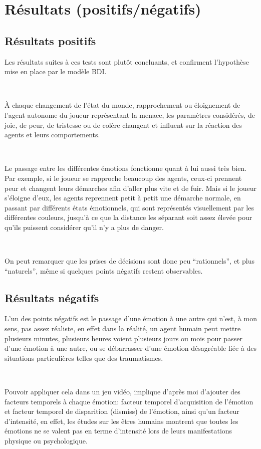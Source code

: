 \section{Résultats (positifs/négatifs)}

\subsection{Résultats positifs}

Les résultats suites à ces tests sont plutôt concluants, et confirment l’hypothèse mise en place par le modèle BDI.


~\par
À chaque changement de l’état du monde, rapprochement ou éloignement de l’agent autonome du joueur représentant la menace, les paramètres considérés, de joie, de peur, de tristesse ou de colère changent et influent sur la réaction des agents et leurs comportements.


~\par
Le passage entre les différentes émotions fonctionne quant à lui aussi très bien. Par exemple, si le joueur se rapproche beaucoup des agents, ceux-ci prennent peur et changent leurs démarches afin d’aller plus vite et de fuir. Mais si le joueur s’éloigne d’eux, les agents reprennent petit à petit une démarche normale, en passant par différents états émotionnels, qui sont représentés visuellement par les différentes couleurs, jusqu’à ce que la distance les séparant soit assez élevée pour qu’ils puissent considérer qu’il n’y a plus de danger.


~\par
On peut remarquer que les prises de décisions sont donc peu “rationnels”, et plus “naturels”, même si quelques points négatifs restent observables.

\subsection{Résultats négatifs}

L’un des points négatifs est le passage d’une émotion à une autre qui n’est, à mon sens, pas assez réaliste, en effet dans la réalité, un agent humain peut mettre plusieurs minutes, plusieurs heures voient plusieurs jours ou mois pour passer d’une émotion à une autre, ou se débarrasser d’une émotion désagréable liée à des situations particulières telles que des traumatismes.

~\par
Pouvoir appliquer cela dans un jeu vidéo, implique d'après moi d’ajouter des facteurs temporels à chaque émotion: facteur temporel d'acquisition de l’émotion et facteur temporel de disparition (dismiss) de l’émotion, ainsi qu'un facteur d’intensité, en effet, les études sur les êtres humains montrent que toutes les émotions ne se valent pas en terme d’intensité lors de leurs manifestations physique ou psychologique.